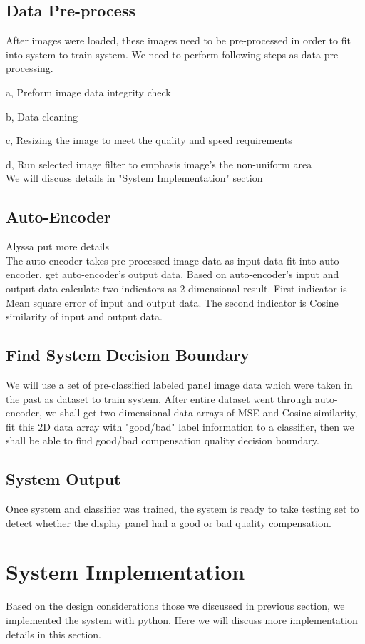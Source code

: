 \documentclass[runningheads]{llncs}
\begin{document}
\subsection{Data Pre-process}
After images were loaded, these images need to be pre-processed in order to fit into system to train system. We need to perform following steps as data pre-processing.
\item{a, Preform image data integrity check}
\item{b, Data cleaning}
\item{c, Resizing the image to meet the quality and speed requirements}
\item{d, Run selected image filter to emphasis image's the non-uniform area}\\
We will discuss details in "System Implementation" section\\
\subsection{Auto-Encoder}
Alyssa put more details\\
The auto-encoder takes pre-processed image data as input data fit into auto-encoder, get auto-encoder's output data. Based on auto-encoder's input and output data calculate two indicators as 2 dimensional result. 
First indicator is Mean square error of input and output data. The second indicator is Cosine similarity of input and output data. \\
\subsection{Find System Decision Boundary}
We will use a set of pre-classified labeled panel image data which were taken in the past as dataset to train system. After entire dataset went through auto-encoder, we shall get two dimensional data arrays of MSE and Cosine similarity, fit this 2D data array with "good/bad" label information to a classifier, then we shall be able to find good/bad compensation quality decision boundary. 
\subsection{System Output}
Once system and classifier was trained, the system is ready to take testing set to detect whether the display panel had a good or bad quality compensation.

\section{System Implementation}
Based on the design considerations those we discussed in previous section, we implemented the system with python. Here we will discuss more implementation details in this section. 
\end{document}
